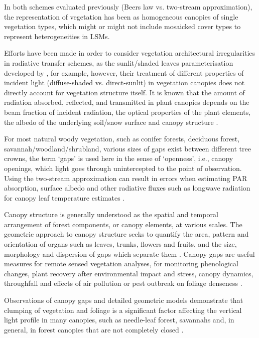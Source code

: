 In both schemes evaluated previously (Beer\textquotesingle s law vs. two-stream approximation), the representation of vegetation has been as homogeneous canopies of single vegetation types, which might or might not include mosaicked cover types to represent heterogeneities in LSMs. 

Efforts have been made in order to consider vegetation architectural irregularities in radiative transfer schemes, as the sunlit/shaded leaves parameterisation developed by \citet{Mercado2007}, for example, however, their treatment of different properties of incident light (diffuse-shaded vs. direct-sunlit) in vegetation canopies does not directly account for vegetation structure itself. It is known that the amount of radiation absorbed, reflected, and transmitted in plant canopies depends on the beam fraction of incident radiation, the optical properties of the plant elements, the albedo of the underlying soil/snow surface and canopy structure \citep{Ross1981}. 

For most natural woody vegetation, such as conifer forests, deciduous forest, savannah/woodland/shrubland, various sizes of gaps exist between different tree crowns, the term `gaps' is used here in the sense of `openness', i.e., canopy openings, which light goes through unintercepted to the point of observation. Using the two-stream approximation can result in errors when estimating PAR absorption, surface albedo and other radiative fluxes such as longwave radiation for canopy leaf temperature estimates \citep{Ni-Meister2010}. 

Canopy structure is generally understood as the spatial and temporal arrangement of forest components, or canopy elements, at various scales. The geometric approach to canopy structure seeks to quantify the area, pattern and orientation of organs such as leaves, trunks, flowers and fruits, and the size, morphology and dispersion of gaps which separate them \citep{Ross1981,Norman1989}. Canopy gaps are useful measures for remote sensed vegetation analyses, for monitoring phenological changes, plant recovery after environmental impact and stress, canopy dynamics, throughfall and effects of air pollution or pest outbreak on foliage denseness \citep{Walter2012}. 

Observations of canopy gaps and detailed geometric models demonstrate that clumping of vegetation and foliage is a significant factor affecting the vertical light profile in many canopies, such as needle-leaf forest, savannahs and, in general, in forest canopies that are not completely closed \citep{Nilson1971,Kucharik1999,Yang2001,Jonckheere2004,Chen2008,Ni-Meister2010}.

